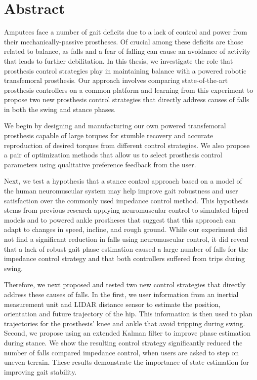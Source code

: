 \chapter*{Abstract}

Amputees face a number of gait deficits due to a lack of control and power
from their mechanically-passive prostheses. Of crucial among these deficits are
those related to balance, as falls and a fear of falling can cause an avoidance
of activity that leads to further debilitation. In this thesis, we investigate
the role that prosthesis control strategies play in maintaining balance with a
powered robotic transfemoral prosthesis. Our approach involves comparing
state-of-the-art prosthesis controllers on a common platform and learning from
this experiment to propose two new prosthesis control strategies that directly
address causes of falls in both the swing and stance phases.

We begin by designing and manufacturing our own powered transfemoral prosthesis
capable of large torques for stumble recovery and accurate reproduction of
desired torques from different control strategies. We also propose a pair of
optimization methods that allow us to select prosthesis control parameters using
qualitative preference feedback from the user.

Next, we test a hypothesis that a stance control approach based on a model of
the human neuromuscular system may help improve gait robustness and user
satisfaction over the commonly used impedance control method. This hypothesis
stems from previous research applying neuromuscular control to simulated biped
models and to powered ankle prostheses that suggest that this approach can adapt
to changes in speed, incline, and rough ground. While our experiment did not
find a significant reduction in falls using neuromuscular control, it did reveal
that a lack of robust gait phase estimation caused a large number of falls for
the impedance control strategy and that both controllers suffered from trips
during swing.

Therefore, we next proposed and tested two new control strategies that directly
address these causes of falls. In the first, we user information from an inertial
measurement unit and LIDAR distance sensor to estimate the position, orientation
and future trajectory of the hip. This information is then used to plan
trajectories for the prosthesis' knee and ankle that avoid tripping during
swing. Second, we propose using an extended Kalman filter to improve phase
estimation during stance. We show the resulting control strategy significantly
reduced the number of falls compared impedance control, when users are asked to
step on uneven terrain. These results demonstrate the importance of state
estimation for improving gait stability.
